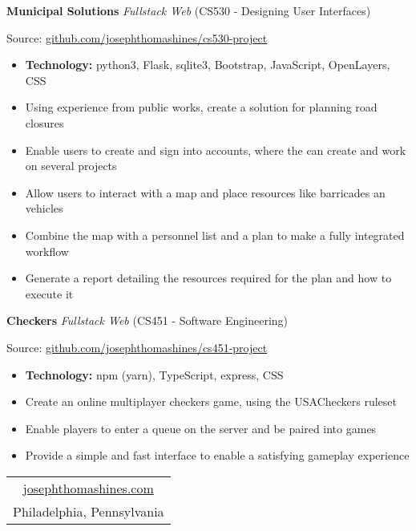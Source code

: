 \documentclass[10pt]{article}
\begin{document}
\vspace{-0.75em}
\textbf{Municipal Solutions}
\emph{Fullstack Web}
(CS530 - Designing User Interfaces)

\indent \indent Source: \href{https://github.com/josephthomashines/cs530-project}{github.com/josephthomashines/cs530-project}

\vspace{-\topsep}
\begin{itemize}
\setlength\itemsep{-0.5em}
\item \textbf{Technology:} python3, Flask, sqlite3, Bootstrap, JavaScript, OpenLayers, CSS
\item Using experience from public works, create a solution for planning road closures
\item Enable users to create and sign into accounts, where the can create and work on several projects
\item Allow users to interact with a map and place resources like barricades an vehicles
\item Combine the map with a personnel list and a plan to make a fully integrated workflow
\item Generate a report detailing the resources required for the plan and how to execute it
\end{itemize}

\vspace{-0.75em}
\textbf{Checkers}
\emph{Fullstack Web}
(CS451 - Software Engineering)

\indent \indent Source: \href{https://github.com/josephthomashines/cs451-project}{github.com/josephthomashines/cs451-project}

\vspace{-\topsep}
\begin{itemize}
\setlength\itemsep{-0.5em}
\item \textbf{Technology:} npm (yarn), TypeScript, express, CSS
\item Create an online multiplayer checkers game, using the USACheckers ruleset
\item Enable players to enter a queue on the server and be paired into games
\item Provide a simple and fast interface to enable a satisfying gameplay experience
\end{itemize}

\hrulefill

\begin{center}
\begin{tabular}{c}
	\href{http://josephthomashines.com}{josephthomashines.com} \\
	Philadelphia, Pennsylvania \\
\end{tabular}
\end{center}
\end{document}
